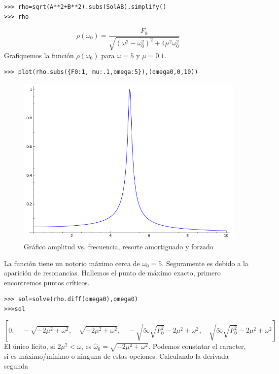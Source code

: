 \begin{lstlisting}
>>> rho=sqrt(A**2+B**2).subs(SolAB).simplify()
>>> rho
\end{lstlisting}
\[
\rho(\omega_0)=
\frac{F_{0}}{\sqrt{(\omega^2-\omega_0^2)^2+4\mu^2\omega_0^2}}
\]
%
Grafiquemos la función $\rho(\omega_0)$ para $\omega=5$ y $\mu=0.1$.
\begin{lstlisting}
>>> plot(rho.subs({F0:1, mu:.1,omega:5}),(omega0,0,10))
\end{lstlisting}
\begin{figure}[h]
\begin{center}
\includegraphics[scale=.3]{imagenes/rho_graf.png}
\end{center}
\caption{Gráfico amplitud vs. frecuencia, resorte amortiguado y forzado}
\end{figure}
La función tiene un notorio máximo cerca de $\omega_0=5$. Seguramente es debido a la aparición de resonancias. Hallemos el punto de máximo exacto, primero encontremos puntos críticos.
\begin{lstlisting}
>>> sol=solve(rho.diff(omega0),omega0)
>>>sol
\end{lstlisting}
\[\left [ 0, \quad - \sqrt{- 2 \mu^{2} + \omega^{2}}, \quad \sqrt{- 2 \mu^{2} + \omega^{2}}, \quad - \sqrt{\tilde{\infty} \sqrt{F_{0}^{2}} - 2 \mu^{2} + \omega^{2}}, \quad \sqrt{\tilde{\infty} \sqrt{F_{0}^{2}} - 2 \mu^{2} + \omega^{2}}\right ]
\]
El único lícito, si $2\mu^2<\omega$,  es $\hat{\omega}_0=\sqrt{- 2 \mu^{2} + \omega^{2}}$.  Podemos constatar el caracter,  si es máximo/mínimo o ninguna de estas opciones. Calculando la derivada segunda
